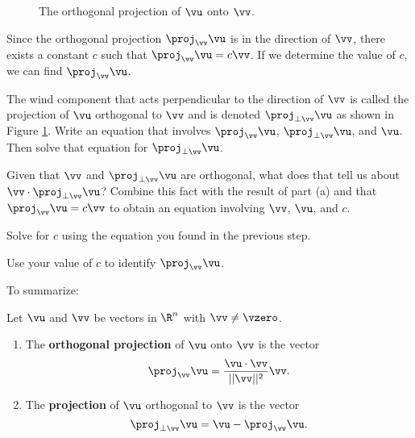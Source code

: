 \begin{figure}[h]
\begin{center}
\end{center}
\caption{The orthogonal projection of $\vu$ onto $\vv$.}
\label{F:Projection}
\end{figure}

\begin{activity} Since the orthogonal projection $\proj_{\vv} \vu$ is in the direction of $\vv$, there exists a constant $c$ such that $\proj_{\vv} \vu = c \vv$. If we determine the value of  $c$, we can find $\proj_{\vv} \vu$.
\ba 
\item The wind component that acts perpendicular to the direction of $\vv$ is called the projection of $\vu$ orthogonal to $\vv$ and is denoted $\proj_{\perp \vv} \vu$ as shown in Figure \ref{F:Projection}. Write an equation that involves $\proj_{\vv} \vu$, $\proj_{\perp \vv} \vu$, and $\vu$. Then solve that equation for $\proj_{\perp \vv} \vu$. 

\item Given that $\vv$ and $\proj_{\perp \vv} \vu$ are orthogonal, what does that tell us about $\vv \cdot \proj_{\perp \vv} \vu$? Combine this fact with the result of part (a) and that $\proj_{\vv} \vu = c \vv$ to obtain an equation involving $\vv$, $\vu$, and $c$. 

\item Solve for $c$ using the equation you found in the previous step.

\item Use your value of $c$ to identify $\proj_{\vv} \vu$. 
\ea
\end{activity}


To summarize:

\begin{definition} Let $\vu$ and $\vv$ be vectors in $\R^n$ with $\vv \neq \vzero$. 
	\begin{enumerate}
	\item The \textbf{orthogonal projection} of $\vu$ onto $\vv$ is the vector 
	\begin{equation}  \label{eq:6_a_projection}
	\proj_{\vv} \vu = \frac{\vu \cdot \vv}{||\vv||^2} \vv.
	\end{equation}
	\item The \textbf{projection} of $\vu$ orthogonal to $\vv$ is the vector 
	\[\proj_{\perp \vv} \vu = \vu - \proj_{\vv} \vu.\]
	\end{enumerate}
\end{definition}



